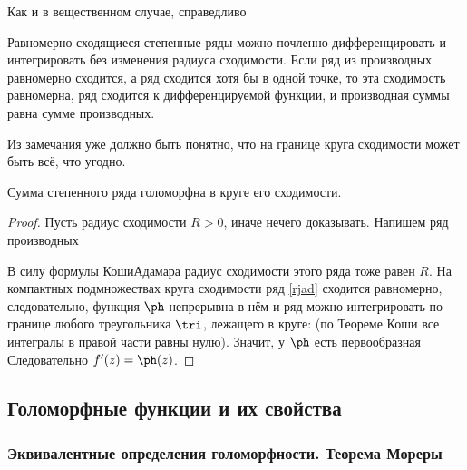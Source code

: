 \documentclass[a4paper]{article}
\begin{document}
Как и в вещественном случае, справедливо
\begin{stm}
Равномерно сходящиеся степенные ряды можно почленно дифференцировать и интегрировать
без изменения радиуса сходимости. Если ряд из производных равномерно сходится, а ряд сходится хотя бы в одной точке, то эта сходимость равномерна,
ряд сходится к дифференцируемой функции, и производная суммы равна сумме производных.
\end{stm}

Из замечания уже должно быть понятно, что на границе круга сходимости может быть всё, что угодно.


\begin{theorem}
Сумма степенного ряда
голоморфна в круге его сходимости.
\end{theorem}
\begin{proof}
Пусть радиус сходимости $R>0$, иначе нечего доказывать. Напишем ряд производных

В силу формулы Коши\ч Адамара радиус сходимости этого ряда тоже равен $R$. На компактных подмножествах круга сходимости ряд \eqref{rjad} сходится равномерно, следовательно, функция $\ph$ непрерывна в нём и ряд можно интегрировать по границе любого треугольника $\tri$, лежащего в круге:
(по Теореме Коши все интегралы в правой части равны нулю). Значит, у $\ph$ есть первообразная
Следовательно $f'(z) = \ph(z)$. \end{proof}




\subsection{Голоморфные функции и их свойства}

\subsubsection{Эквивалентные определения голоморфности. Теорема Мореры}
\end{document}

